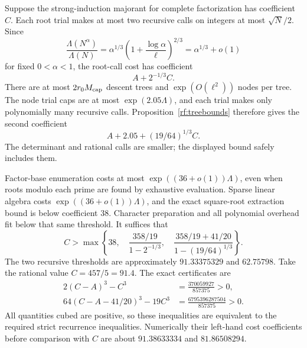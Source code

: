 Suppose the strong-induction majorant for complete factorization
has coefficient $C$.  Each root trial makes at most two recursive
calls on integers at most $\sqrt N/2$.  Since
\[
 \frac{\Lambda(N^\alpha)}{\Lambda(N)}
 =\alpha^{1/3}
   \left(1+\frac{\log\alpha}{\ell}\right)^{2/3}
 =\alpha^{1/3}+o(1)
\]
for fixed $0<\alpha<1$, the root-call cost has coefficient
\begin{equation}
 A+2^{-1/3}C.
 \label{rf:rootrec}
\end{equation}
There are at most $2r_0M_{\rm cap}$ descent trees and
$\exp(O(\ell^2))$ nodes per tree.  The node trial caps are at
most $\exp(2.05\Lambda)$, and each trial makes only polynomially
many recursive calls.  Proposition~\ref{rf:treebounds} therefore
gives the second coefficient
\begin{equation}
 A+2.05+(19/64)^{1/3}C.
 \label{rf:descrec}
\end{equation}
The determinant and rational calls are smaller; the displayed
bound safely includes them.

Factor-base enumeration costs at most
$\exp((36+o(1))\Lambda)$, even when roots modulo each prime are
found by exhaustive evaluation.  Sparse linear algebra costs
$\exp((36+o(1))\Lambda)$, and the exact square-root extraction
bound is below coefficient $38$.  Character preparation and
all polynomial overhead fit below that same threshold.
It suffices that
\begin{equation}
 C>\max\left\{
 38,\quad \frac{358/19}{1-2^{-1/3}},\quad
 \frac{358/19+41/20}{1-(19/64)^{1/3}}
 \right\}.
 \label{rf:threshold}
\end{equation}
The two recursive thresholds are approximately $91.33375329$
and $62.75798$.  Take the rational value
$C=457/5=91.4$.
The exact certificates are
\begin{align}
 2(C-A)^3-C^3&=\frac{370059927}{857375}>0,
 \label{rf:cert1}\\
 64(C-A-41/20)^3-19C^3
             &=\frac{6795396287504}{857375}>0.
 \label{rf:cert2}
\end{align}
All quantities cubed are positive, so these inequalities are
equivalent to the required strict recurrence inequalities.
Numerically their left-hand cost coefficients before comparison
with $C$ are about $91.38633334$ and $81.86508294$.

